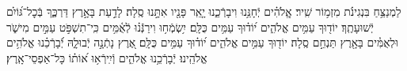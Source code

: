 \documentclass[twoside, openany, parskip=half, 11pt]{book}
\begin{document}
לַמְנַצֵּ֥חַ בִּנְגִינֹ֗ת מִזְמ֥וֹר שִֽׁיר׃ אֱֽלֹהִ֗ים יְֿחָנֵּ֥נוּ וִיבָרְֿכֵ֑נוּ יָ֤אֵֽר פָּנָ֖יו אִתָּ֣נוּ סֶֽלָה׃ לָדַ֣עַת בָּאָ֣רֶץ דַּרְכֶּ֑ךָ בְּֿכׇל־גּ֝וֹיִ֗ם יְֿשׁוּעָתֶֽךָ׃ יוֹד֖וּךָ עַמִּ֥ים אֱלֹהִ֑ים י֝וֹד֗וּךָ עַמִּ֥ים כֻּלָּֽם׃ יִ֥שְׂמְֿח֥וּ וִירַנְּֿֿנ֗וּ לְֿאֻ֫מִּ֥ים כִּֽי־תִשְׁפֹּ֣ט עַמִּ֣ים מִישֹׁ֑ר וּלְאֻמִּ֓ים בָּאָ֖רֶץ תַּנְחֵ֣ם סֶֽלָה׃ יוֹד֖וּךָ עַמִּ֥ים אֱלֹהִ֑ים י֝וֹד֗וּךָ עַמִּ֥ים כֻּלָּֽם׃ אֶ֭רֶץ נָתְֿנָ֣ה יְֿבוּלָ֑הּ יְֿ֝בָרְֿכֵ֗נוּ אֱלֹהִ֥ים
אֱלֹהֵֽינוּ׃ יְֿבָרְֿכֵ֥נוּ אֱלֹהִ֑ים וְֿיִֽירְֿא֥וּ א֝וֹת֗וֹ כָּל־אַפְסֵי־אָֽרֶץ׃
%
%
%
%
%
%
%
%
%
\end{document}
